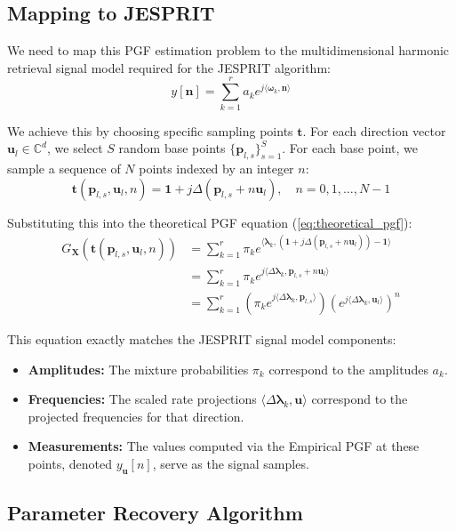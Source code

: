 \subsection{Mapping to JESPRIT}

We need to map this PGF estimation problem to the multidimensional harmonic retrieval signal model required for the JESPRIT algorithm:
$$ y[\mathbf{n}] = \sum_{k=1}^{r} a_k e^{j \langle \boldsymbol{\omega}_k, \mathbf{n} \rangle} $$

We achieve this by choosing specific sampling points $\mathbf{t}$. For each direction vector $\mathbf{u}_l \in \mathbb{C}^d$, we select $S$ random base points $\{\mathbf{p}_{l,s}\}_{s=1}^S$. For each base point, we sample a sequence of $N$ points indexed by an integer $n$:
$$ \mathbf{t}(\mathbf{p}_{l,s}, \mathbf{u}_l, n) = \mathbf{1} + j \Delta (\mathbf{p}_{l,s} + n \mathbf{u}_l), \quad n = 0, 1, \dots, N-1 $$

Substituting this into the theoretical PGF equation (\ref{eq:theoretical_pgf}):
\begin{align*}
    G_{\mathbf{X}}(\mathbf{t}(\mathbf{p}_{l,s}, \mathbf{u}_l, n)) &= \sum_{k=1}^{r} \pi_k e^{\langle \boldsymbol{\lambda}_k, (\mathbf{1} + j \Delta (\mathbf{p}_{l,s} + n \mathbf{u}_l)) - \mathbf{1} \rangle} \\
    &= \sum_{k=1}^{r} \pi_k e^{j \langle \Delta \boldsymbol{\lambda}_k, \mathbf{p}_{l,s} + n \mathbf{u}_l \rangle} \\
    &= \sum_{k=1}^{r} \left( \pi_k e^{j \langle \Delta \boldsymbol{\lambda}_k, \mathbf{p}_{l,s} \rangle} \right) \left(e^{j \langle \Delta \boldsymbol{\lambda}_k, \mathbf{u}_l \rangle}\right)^n
\end{align*}

This equation exactly matches the JESPRIT signal model components:
\begin{itemize}
    \item \textbf{Amplitudes:} The mixture probabilities $\pi_k$ correspond to the amplitudes $a_k$.
    \item \textbf{Frequencies:} The scaled rate projections $\langle \Delta \boldsymbol{\lambda}_k, \mathbf{u} \rangle$ correspond to the projected frequencies for that direction.
    \item \textbf{Measurements:} The values computed via the Empirical PGF at these points, denoted $y_{\mathbf{u}}[n]$, serve as the signal samples.
\end{itemize}

\subsection{Parameter Recovery Algorithm}

